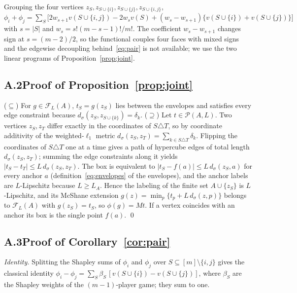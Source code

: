 \begin{remark}\label{rem:sum}
Grouping the four vertices $z_S,z_{S\cup\{i\}},z_{S\cup\{j\}},z_{S\cup\{i,j\}}$,
$\phi_i+\phi_j=\sum_{S}\bigl[2w_{s+1}v(S\cup\{i,j\})-2w_sv(S)+(w_s-w_{s+1})\{v(S\cup\{i\})+v(S\cup\{j\})\}\bigr]$ with
$s=|S|$ and $w_s=s!(m-s-1)!/m!$. The coefficient $w_s-w_{s+1}$ changes sign at $s=(m-2)/2$, so the functional couples
four faces with mixed signs and the edgewise decoupling behind~\eqref{eq:pair} is not available; we use the two linear
programs of Proposition~\ref{prop:joint}.
\end{remark}

\subsection*{A.2\quad Proof of Proposition~\ref{prop:joint}}
($\subseteq$) For $g\in\mathcal F_L(A)$, $t_S=g(z_S)$ lies between the envelopes and satisfies every edge constraint
because $d_\sigma(z_S,z_{S\cup\{k\}})=\delta_k$. ($\supseteq$) Let $t\in\mathcal P(A,L)$. Two vertices $z_S,z_T$ differ
exactly in the coordinates of $S\triangle T$, so by coordinate additivity of the weighted-$\ell_1$ metric
$d_\sigma(z_S,z_T)=\sum_{k\in S\triangle T}\delta_k$. Flipping the coordinates of $S\triangle T$ one at a time gives a
path of hypercube edges of total length $d_\sigma(z_S,z_T)$; summing the edge constraints along it yields
$|t_S-t_T|\le L\,d_\sigma(z_S,z_T)$. The box is equivalent to $|t_S-f(a)|\le L\,d_\sigma(z_S,a)$ for every anchor $a$
(definition~\eqref{eq:envelopes} of the envelopes), and the anchor labels are $L$-Lipschitz because $L\ge L_A$. Hence the
labeling of the finite set $A\cup\{z_S\}$ is $L$-Lipschitz, and its McShane extension
$g(z)=\min_{p}\{t_p+L\,d_\sigma(z,p)\}$ belongs to $\mathcal F_L(A)$ with $g(z_S)=t_S$, so $\phi(g)=Mt$. If a vertex coincides
with an anchor its box is the single point $f(a)$. \qed

\subsection*{A.3\quad Proof of Corollary~\ref{cor:pair}}
\emph{Identity.} Splitting the Shapley sums of $\phi_i$ and $\phi_j$ over $S\subseteq[m]\setminus\{i,j\}$ gives the classical
identity $\phi_i-\phi_j=\sum_S\beta_S\,[v(S\cup\{i\})-v(S\cup\{j\})]$, where $\beta_S$ are the Shapley weights of the
$(m-1)$-player game; they sum to one.

